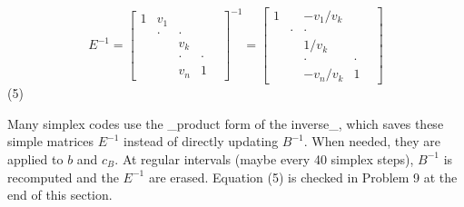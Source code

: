 \[E^{-1}=\begin{bmatrix}1&v_{1}&&\\ &\cdot&\cdot&\\ &&v_{k}&\\ &&\cdot&\cdot&\\ &&v_{n}&1\end{bmatrix}^{-1}=\begin{bmatrix}1&&-v_{1}/v_{k}&\\ &\cdot&\cdot&\\ &&1/v_{k}&\\ &&\cdot&\cdot&\\ &&-v_{n}/v_{k}&1\end{bmatrix}\] (5)

Many simplex codes use the _product form of the inverse_, which saves these simple matrices \(E^{-1}\) instead of directly updating \(B^{-1}\). When needed, they are applied to \(b\) and \(c_{B}\). At regular intervals (maybe every 40 simplex steps), \(B^{-1}\) is recomputed and the \(E^{-1}\) are erased. Equation (5) is checked in Problem 9 at the end of this section.

 